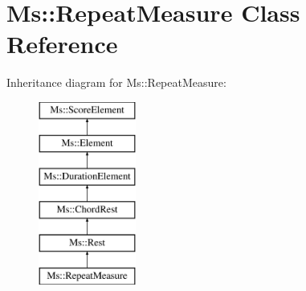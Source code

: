 \hypertarget{class_ms_1_1_repeat_measure}{}\section{Ms\+:\+:Repeat\+Measure Class Reference}
\label{class_ms_1_1_repeat_measure}
Inheritance diagram for Ms\+:\+:Repeat\+Measure\+:\begin{figure}[H]
\begin{center}
\leavevmode
\includegraphics[height=6.000000cm]{class_ms_1_1_repeat_measure}
\end{center}
\end{figure}
